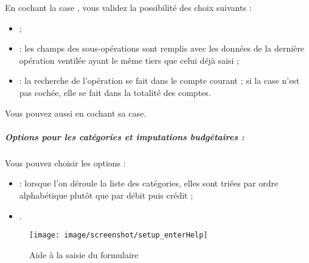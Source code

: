 En cochant la case , vous validez la possibilité des choix suivants :

\begin{itemize}
	\item {} ;
	\item {} : les champs des sous-opérations sont remplis avec les données de la dernière opération ventilée ayant le même tiers que celui déjà saisi ;
	\item {} : la recherche de l'opération se fait dans le compte courant ; si la case n'est pas cochée, elle se fait dans la totalité des comptes.
\end{itemize}



Vous pouvez aussi  en cochant sa case.


\subparagraph{Options pour les catégories et imputations budgétaires :\label{setup-form-categories}}

Vous pouvez choisir les options :

\begin{itemize}

	\item {} : lorsque l'on déroule la liste des catégories, elles sont triées par ordre alphabétique plutôt que par débit puis crédit ;
	\item {}.
\end{itemize}

\ifIllustration
\begin{figure}[ht]
\begin{center}
\texttt{[image: image/screenshot/setup\_enterHelp]}
\end{center}
\caption{Aide à la saisie du formulaire}
\label{setup-enterHelp-img}
\end{figure}
\fi




